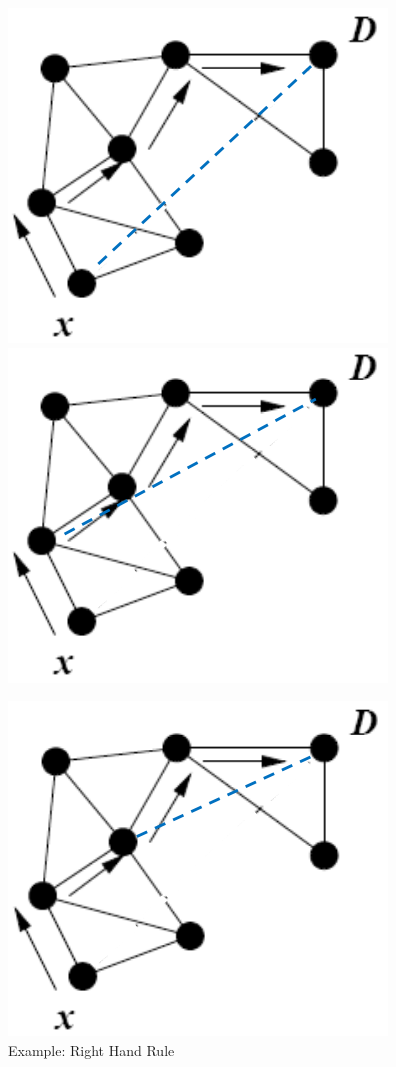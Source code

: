 \begin{figure}[!h]
    \centering
    \includegraphics[scale = 0.4]{images/rhr-1.png}
    \includegraphics[scale = 0.4]{images/rhr-2.png}
\end{figure}
\begin{figure}[!h]
    \centering
    \includegraphics[scale = 0.4]{images/rhr-3.png}
    \caption{Example: Right Hand Rule}
    \label{RightHandRule}
\end{figure}
